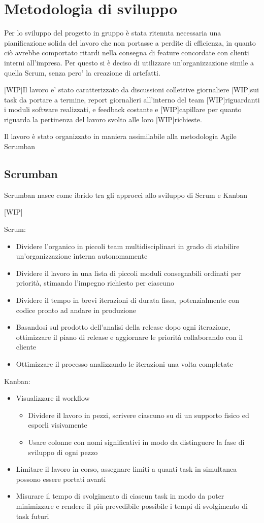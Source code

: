 \chapter{Metodologia di sviluppo}
Per lo sviluppo del progetto in gruppo è stata ritenuta necessaria una pianificazione solida del lavoro che non portasse a perdite di efficienza, in quanto ciò avrebbe comportato ritardi nella consegna di feature concordate con clienti interni all'impresa.
Per questo si è deciso di utilizzare un'organizzazione simile a quella Scrum, senza pero' la creazione di artefatti.

[WIP]Il lavoro e' stato caratterizzato da discussioni collettive giornaliere [WIP]sui task da portare a termine, report giornalieri all'interno del team [WIP]riguardanti i moduli software realizzati, e feedback costante e [WIP]capillare per quanto riguarda la pertinenza del lavoro svolto alle loro [WIP]richieste.

Il lavoro è stato organizzato in maniera assimilabile alla metodologia Agile Scrumban
\section{Scrumban}
Scrumban nasce come ibrido tra gli approcci allo sviluppo di Scrum e Kanban

[WIP]
\begin{multicols}{2}
Scrum:
\begin{itemize}
\item
Dividere l'organico in piccoli team multidisciplinari in grado di stabilire un'organizzazione interna autonomamente
\item
Dividere il lavoro in una lista di piccoli moduli consegnabili ordinati per priorità, stimando l'impegno richiesto per ciascuno
\item
Dividere il tempo in brevi iterazioni di durata fissa, potenzialmente con codice pronto ad andare in produzione
\item
Basandosi sul prodotto dell'analisi della release dopo ogni iterazione, ottimizzare il piano di release e aggiornare le priorità collaborando con il cliente
\item
Ottimizzare il processo analizzando le iterazioni una volta completate
\end{itemize}
\columnbreak
Kanban:
\begin{itemize}
\item
Visualizzare il workflow
\begin{itemize}
\item
Dividere il lavoro in pezzi, scrivere ciascuno su di un supporto fisico ed esporli visivamente
\item
Usare colonne con nomi significativi in modo da distinguere la fase di sviluppo di ogni pezzo
\end{itemize}
\item
Limitare il lavoro in corso, assegnare limiti a quanti task in simultanea possono essere portati avanti
\item
Misurare il tempo di svolgimento di ciascun task in modo da poter minimizzare e rendere il più prevedibile possibile i tempi di svolgimento di task futuri
\end{itemize}
\end{multicols}

